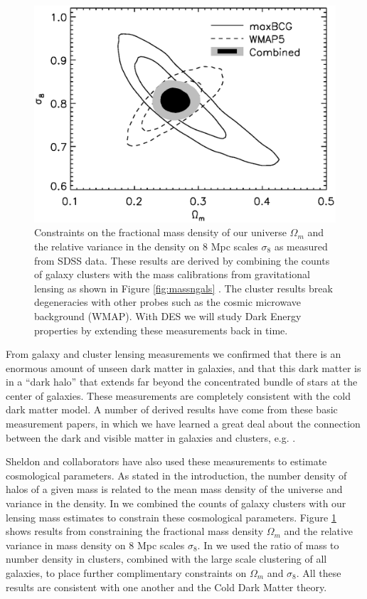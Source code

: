 \documentclass[12pt]{article}
\begin{document}
\begin{figure}[p] 
\centering 
\includegraphics[scale=0.6]{s8_Om.ps}

\caption{Constraints on the fractional mass density of our universe $\Omega_m$
and the relative variance in the density on 8 Mpc scales $\sigma_8$ as measured
from SDSS data.  These results \cite{RozoCosmo09} are derived by combining the
counts of galaxy clusters with the mass calibrations from gravitational lensing
as shown in Figure \ref{fig:massngals}
\cite{SheldonLensing07,JohnstonLensing07}.  The cluster results break
degeneracies with other probes such as the cosmic microwave background (WMAP).
With DES we will study Dark Energy properties by extending these measurements
back in time.  \label{fig:omegasigma8}} \end{figure}

From galaxy and cluster lensing measurements we confirmed that there is an
enormous amount of unseen dark matter in galaxies, and that this dark matter is
in a ``dark halo'' that extends far beyond the concentrated bundle of stars at
the center of galaxies.  These measurements are completely consistent with the
cold dark matter model.  A number of derived results have come from these basic
measurement papers, in which we have learned a great deal about the connection
between the dark and visible matter in galaxies and clusters, e.g.
\cite{RykoffLXM08,RozoScatter09,TinkerM2N2012}. 

Sheldon and collaborators have also used these measurements to estimate
cosmological parameters.  As stated in the introduction, the number density of
halos of a given mass is related to the mean mass density of the universe and
variance in the density.  In \cite{RozoCosmo09} we combined the counts of
galaxy clusters with our lensing mass estimates to constrain these cosmological
parameters.  Figure \ref{fig:omegasigma8} shows results from \cite{RozoCosmo09}
constraining the fractional mass density $\Omega_m$ and the relative variance
in mass density on 8 Mpc scales $\sigma_8$.  In \cite{TinkerM2N2012} we used
the ratio of mass to number density in clusters, combined with the large scale
clustering of all galaxies, to place further complimentary constraints on
$\Omega_m$ and $\sigma_8$.  All these results are consistent with one another
and the Cold Dark Matter theory.
\end{document}
